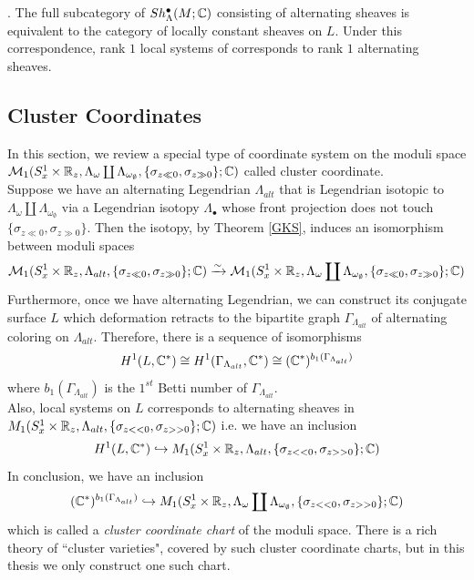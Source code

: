 \begin{theorem}
\cite[Thm.~4.16]{shende2019cluster}\cite[Cor.~4.17]{shende2019cluster}. The full subcategory of $Sh^\bullet_\Lambda(M;\mathbb{C})$ consisting of alternating sheaves is equivalent to the category of locally constant sheaves on $L$. Under this correspondence, rank $1$ local systems of corresponds to rank $1$ alternating sheaves.
\end{theorem}

\subsection*{Cluster Coordinates}
In this section, we review a special type of coordinate system on the moduli space $\mathcal{M}_1(S^1_x\times \mathbb{R}_z,\Lambda_\omega \coprod \Lambda_{\omega_\emptyset},\{\sigma_{z\ll 0},\sigma_{z\gg 0}\};\mathbb{C})$ called cluster coordinate.\\
Suppose we have an alternating Legendrian $\Lambda_{alt}$ that is Legendrian isotopic to $\Lambda_{\omega}\coprod \Lambda_{\omega_\emptyset}$ via a Legendrian isotopy $\Lambda_{\bullet}$ whose front projection does not touch $\{\sigma_{z\ll 0},\sigma_{z\gg 0}\}$. Then the isotopy, by Theorem \ref{GKS}, induces an isomorphism between moduli spaces
\[
\mathcal{M}_1(S^1_x\times \mathbb{R}_z,\Lambda_{alt},\{\sigma_{z\ll 0},\sigma_{z\gg 0}\};\mathbb{C}) \xrightarrow{\sim}\mathcal{M}_1(S^1_x\times \mathbb{R}_z,\Lambda_\omega \coprod \Lambda_{\omega_\emptyset},\{\sigma_{z\ll 0},\sigma_{z\gg 0}\};\mathbb{C})
\]
Furthermore, once we have alternating Legendrian, we can construct its conjugate surface $L$ which deformation retracts to the bipartite graph $\Gamma_{\Lambda_{alt}}$ of alternating coloring on $\Lambda_{alt}$. Therefore, there is a sequence of isomorphisms
\[
H^1(L,\mathbb{C}^*) \cong H^1(\Gamma_{\Lambda_{alt}},\mathbb{C}^*) \cong (\mathbb{C}^*)^{b_1(\Gamma_{\Lambda_{alt}})}
\]
where $b_1(\Gamma_{\Lambda_{alt}})$ is the $1^{st}$ Betti number of $\Gamma_{\Lambda_{alt}}$.\\
Also, local systems on $L$ corresponds to alternating sheaves in $M_1(S^1_x\times \mathbb{R}_z, \Lambda_{alt},\{\sigma_{z<<0},\sigma_{z>>0}\};\mathbb{C})$ i.e. we have an inclusion
\[
H^1(L,\mathbb{C}^*)\hookrightarrow M_1(S^1_x\times \mathbb{R}_z, \Lambda_{alt},\{\sigma_{z<<0},\sigma_{z>>0}\};\mathbb{C})
\]
In conclusion, we have an inclusion
\[
(\mathbb{C}^*)^{b_1(\Gamma_{\Lambda_{alt}})}\hookrightarrow M_1(S^1_x\times \mathbb{R}_z, \Lambda_{\omega}\coprod \Lambda_{\omega_{\emptyset}},\{\sigma_{z<<0},\sigma_{z>>0}\};\mathbb{C})
\]
which is called a \emph{cluster coordinate chart} of the moduli space. There is a rich theory of ``cluster varieties", covered by such cluster coordinate charts, but in this thesis we only construct one such chart.\\
